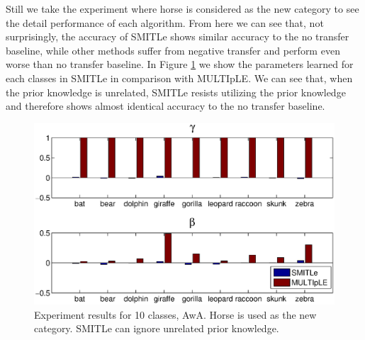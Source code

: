 Still we take the experiment where horse is considered as the new category to see the detail performance of each algorithm. %
From here we can see that, not surprisingly, the accuracy of SMITLe shows similar accuracy to the no transfer baseline, while other methods suffer from negative transfer and perform even worse than no transfer baseline. In Figure \ref{fig:a2c} we show the parameters learned for each classes in SMITLe in comparison with MULTIpLE. We can see that, when the prior knowledge is unrelated, SMITLe resists utilizing the prior knowledge and therefore shows almost identical accuracy to the no transfer baseline.

\begin{figure}
	\centering
	 \includegraphics[scale=0.3]{fig/A2C_gama.eps} %
	\caption{Experiment results for 10 classes, AwA. Horse is used as the new category. SMITLe can ignore unrelated prior knowledge.}
	\label{fig:a2c}
\end{figure}


